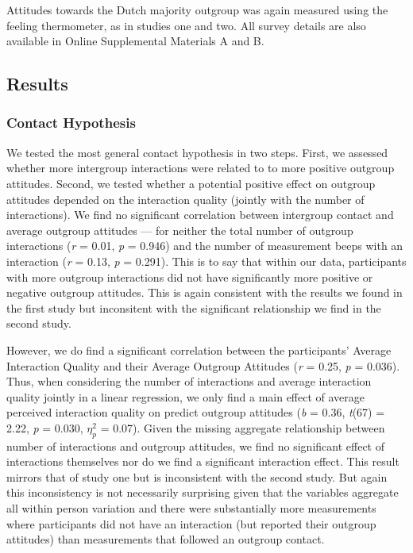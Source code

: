 Attitudes towards the Dutch majority outgroup was again measured using
the feeling thermometer, as in studies one and two. All survey details
are also available in Online Supplemental Materials A and B.

\subsection{Results}

\subsubsection{Contact Hypothesis}

We tested the most general contact hypothesis in two steps. First, we
assessed whether more intergroup interactions were related to to more
positive outgroup attitudes. Second, we tested whether a potential
positive effect on outgroup attitudes depended on the interaction
quality (jointly with the number of interactions). We find no
significant correlation between intergroup contact and average outgroup
attitudes --- for neither the total number of outgroup interactions
(\textit{r} = 0.01, \textit{p} = 0.946) and the number of measurement
beeps with an interaction (\textit{r} = 0.13, \textit{p} = 0.291). This
is to say that within our data, participants with more outgroup
interactions did not have significantly more positive or negative
outgroup attitudes. This is again consistent with the results we found
in the first study but inconsitent with the significant relationship we
find in the second study.

However, we do find a significant correlation between the participants'
Average Interaction Quality and their Average Outgroup Attitudes
(\textit{r} = 0.25, \textit{p} = 0.036). Thus, when considering the
number of interactions and average interaction quality jointly in a
linear regression, we only find a main effect of average perceived
interaction quality on predict outgroup attitudes (\textit{b} = 0.36,
\textit{t}(67) = 2.22, \textit{p} = 0.030, \(\eta_p^2\) = 0.07). Given
the missing aggregate relationship between number of interactions and
outgroup attitudes, we find no significant effect of interactions
themselves nor do we find a significant interaction effect. This result
mirrors that of study one but is inconsistent with the second study. But
again this inconsistency is not necessarily surprising given that the
variables aggregate all within person variation and there were
substantially more measurements where participants did not have an
interaction (but reported their outgroup attitudes) than measurements
that followed an outgroup contact.

